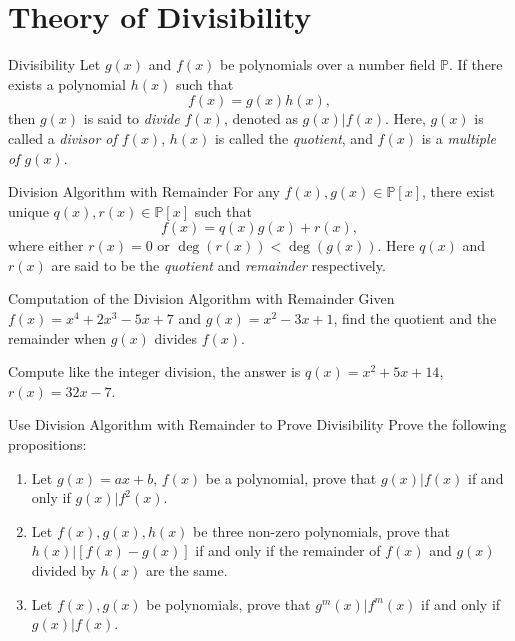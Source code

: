 
\section{Theory of Divisibility}

\begin{definition}{Divisibility}{}
  Let $g(x)$ and $f(x)$ be polynomials over a number field $\mathbb{P}$.
  If there exists a polynomial $h(x)$ such that
  \begin{equation}
    f(x) = g(x) h(x),
  \end{equation}
  then $g(x)$ is said to \emph{divide $f(x)$}, denoted as $g(x)| f(x)$.
  Here, $g(x)$ is called a \emph{divisor of $f(x)$},
  $h(x)$ is called the \emph{quotient},
  and $f(x)$ is a \emph{multiple of $g(x)$}.
\end{definition}

\begin{proposition}{Division Algorithm with Remainder}{}
  For any $f(x), g(x) \in \mathbb{P}[x]$,
  there exist unique $q(x), r(x) \in \mathbb{P}[x]$ such that
  \begin{equation}
    f(x) = q(x) g(x) + r(x),
  \end{equation}
  where either $r(x) = 0$ or $\operatorname{deg}(r(x)) < \operatorname{deg} (g(x))$.
  Here $q(x)$ and $r(x)$ are said to be the \emph{quotient} and \emph{remainder} respectively.
\end{proposition}

\begin{example}{Computation of the Division Algorithm with Remainder}{}
  Given $f(x) = x^4 + 2x^3 - 5x + 7$ and $g(x) = x^2 - 3x + 1$,
  find the quotient and the remainder when $g(x)$ divides $f(x)$.
\end{example}

\begin{solution}
  Compute like the integer division, the answer is $q(x) = x^2 + 5x + 14$, $r(x)
  = 32x - 7$.
\end{solution}

\begin{example}{Use Division Algorithm with Remainder to Prove Divisibility}{}
  Prove the following propositions:
  \begin{enumerate}
  \item Let $g(x) = ax + b$, $f(x)$ be a polynomial, prove that $g(x) | f(x)$ if
    and only if $g(x) | f^2(x)$.
  \item Let $f(x), g(x), h(x)$ be three non-zero polynomials, prove that
    $h(x) | [f(x) - g(x)]$ if and only if the remainder of $f(x)$ and $g(x)$
    divided by $h(x)$ are the same.
  \item Let $f(x), g(x)$ be polynomials, prove that $g^m(x)|f^m(x)$ if and only if
    $g(x)|f(x)$.
  \end{enumerate}
\end{example}

